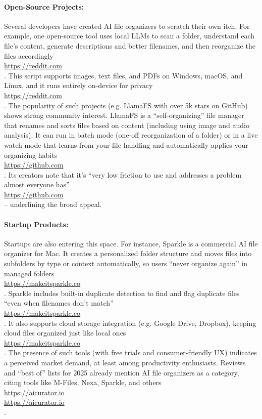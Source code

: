 \documentclass[11pt]{article}
\begin{document}
\paragraph{Open-Source Projects:} Several developers have created AI file organizers to scratch their own itch. For example, one open-source tool uses local LLMs to scan a folder, understand each file’s content, generate descriptions and better filenames, and then reorganize the files accordingly \\ \url{https://reddit.com} \\ . This script supports images, text files, and PDFs on Windows, macOS, and Linux, and it runs entirely on-device for privacy \\ \url{https://reddit.com} \\ . The popularity of such projects (e.g. LlamaFS with over 5k stars on GitHub) shows strong community interest. LlamaFS is a “self-organizing” file manager that renames and sorts files based on content (including using image and audio analysis). It can run in batch mode (one-off reorganization of a folder) or in a live watch mode that learns from your file handling and automatically applies your organizing habits \\ \url{https://github.com} \\ . Its creators note that it’s “very low friction to use and addresses a problem almost everyone has” \\ \url{https://github.com} \\ -- underlining the broad appeal.

\paragraph{Startup Products:} Startups are also entering this space. For instance, Sparkle is a commercial AI file organizer for Mac. It creates a personalized folder structure and moves files into subfolders by type or context automatically, so users “never organize again” in managed folders \\ \url{https://makeitsparkle.co} \\ . Sparkle includes built-in duplicate detection to find and flag duplicate files “even when filenames don’t match” \\ \url{https://makeitsparkle.co} \\ . It also supports cloud storage integration (e.g. Google Drive, Dropbox), keeping cloud files organized just like local ones \\ \url{https://makeitsparkle.co} \\ . The presence of such tools (with free trials and consumer-friendly UX) indicates a perceived market demand, at least among productivity enthusiasts. Reviews and “best of” lists for 2025 already mention AI file organizers as a category, citing tools like M-Files, Nexa, Sparkle, and others \\ \url{https://aicurator.io} \\ \url{https://aicurator.io} \\ .
\end{document}
